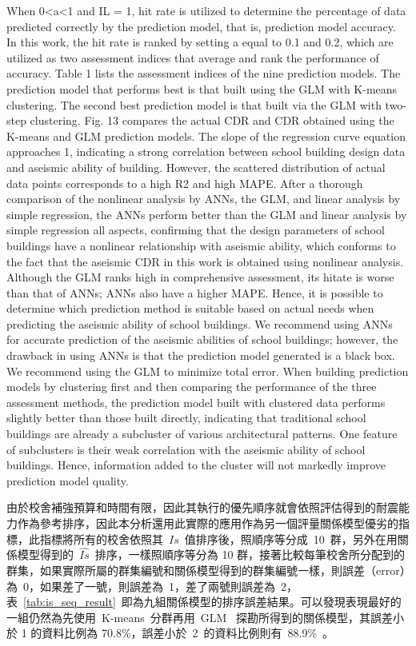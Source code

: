 When 0<a<1 and I{L} = 1, hit rate is utilized to determine the percentage of data predicted correctly by the prediction model, that is, prediction model accuracy. In this work, the hit rate is ranked by setting a equal to 0.1 and 0.2, which are utilized as two assessment indices that average and rank the performance of accuracy. Table 1 lists the assessment indices of the nine prediction models. The prediction model that performs best is that built using the GLM with K-means clustering. The second best prediction model is that built via the GLM with two-step clustering. Fig. 13 compares the actual CDR and CDR obtained using the K-means and GLM prediction models. The slope of the regression curve equation approaches 1, indicating a strong correlation between school building design data and aseismic ability of building. However, the scattered distribution of actual data points corresponds to a high R2 and high MAPE. After a thorough comparison of the nonlinear analysis by ANNs, the GLM, and linear analysis by simple regression, the ANNs perform better than the GLM and linear analysis by simple regression all aspects, confirming that the design parameters of school buildings have a nonlinear relationship with aseismic ability, which conforms to the fact that the aseismic CDR in this work is obtained using nonlinear analysis. Although the GLM ranks high in comprehensive assessment, its hitate is worse than that of ANNs; ANNs also have a higher MAPE. Hence, it is possible to determine which prediction method is suitable based on actual needs when predicting the aseismic ability of school buildings. We recommend using ANNs for accurate prediction of the aseismic abilities of school buildings; however, the drawback in using ANNs is that the prediction model generated is a black box. We recommend using the GLM to minimize total error. When building prediction models by clustering first and then comparing the performance of the three assessment methods, the prediction model built with clustered data performs slightly better than those built directly, indicating that traditional school buildings are already a subcluster of various architectural patterns. One feature of subclusters is their weak correlation with the aseismic ability of school buildings. Hence, information added to the cluster will not markedly improve prediction model quality.

由於校舍補強預算和時間有限，因此其執行的優先順序就會依照評估得到的耐震能力作為參考排序，因此本分析還用此實際的應用作為另一個評量關係模型優劣的指標，此指標將所有的校舍依照其~$Is$~值排序後，照順序等分成~10~群，另外在用關係模型得到的~$\hat{Is}$~排序，一樣照順序等分為 10 群，接著比較每筆校舍所分配到的群集，如果實際所屬的群集編號和關係模型得到的群集編號一樣，則誤差（error）為~0，如果差了一號，則誤差為~1，差了兩號則誤差為~2，表~\ref{tab:is_seq_result}~即為九組關係模型的排序誤差結果。可以發現表現最好的一組仍然為先使用~K-means~分群再用~GLM~ 探勘所得到的關係模型，其誤差小於 1 的資料比例為 70.8\%，誤差小於~2~的資料比例則有~88.9\%~。

